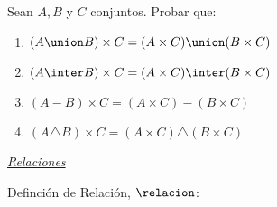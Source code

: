 \ejercicio Sean $A, B$ y $C$ conjuntos. Probar que:
\begin{enumerate}[label=\roman*)]
	\item $(A \union B) \times C = (A \times C) \union (B \times C)$
	\item $(A \inter B) \times C = (A \times C) \inter (B \times C)$
	\item $(A - B) \times C = (A \times C) - (B \times C)$
	\item $(A \triangle B) \times C = (A \times C) \triangle (B \times C)$
\end{enumerate}


\noindent\separador

\underline{\textit{Relaciones}}

Definción de Relación, $\relacion$:
\begin{center}
\end{center}
